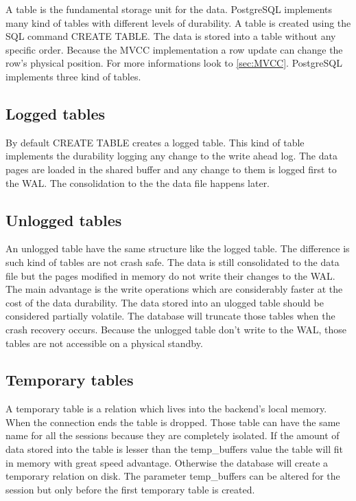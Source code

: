 A table is the fundamental storage unit for the data. PostgreSQL implements many kind of tables
with different levels of durability. A table is created using the SQL command CREATE TABLE. The data
is stored into a table without any specific order. Because the MVCC implementation a row update can
change the row's physical position. For more informations look to \ref{sec:MVCC}. PostgreSQL
implements three kind of tables.

\subsection{Logged tables}
By default CREATE TABLE creates a logged table. This kind of table implements the durability
logging any change to the write ahead log. The data pages are loaded in the shared buffer and any
change to them is logged first to the WAL. The consolidation to the the data file happens later. 

\subsection{Unlogged tables}
\label{sub:UNLOGGEDTABLES}
An unlogged table have the same structure like the logged table. The difference is such kind of 
tables are not crash safe. The data is still consolidated to the data file but the pages modified 
in memory do not write their changes to the WAL. The main advantage is the write operations which 
are considerably faster at the cost of the data durability. The data stored into an ulogged table
should be considered partially volatile. The database will truncate those tables when the crash
recovery occurs. Because the unlogged table don't write to the WAL, those tables are not accessible 
on a physical standby. 

\subsection{Temporary tables}
A temporary table is a relation which lives into the backend's local memory. When the connection 
ends the table is dropped. Those table can have the same name for all the sessions because 
they are completely isolated. If the amount of data stored into the table is lesser than 
the temp\_buffers value the table will fit in memory with great speed advantage. Otherwise the 
database will create a temporary relation on disk. The parameter temp\_buffers can be altered for 
the session but only before the first temporary table is created. 


